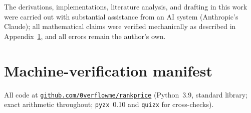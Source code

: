 \documentclass[11pt]{article}
\theoremstyle{definition}
\theoremstyle{remark}
\newcommand{\code}[1]{\texttt{#1}}
\begin{document}
The derivations, implementations, literature analysis, and drafting in this work were carried out
with substantial assistance from an AI system (Anthropic's Claude); all mathematical claims
were verified mechanically as described in Appendix~\ref{app:manifest}, and all errors remain the author's own.

\appendix

\section{Machine-verification manifest}\label{app:manifest}

All code at \href{https://github.com/0verflowme/rankprice}{\code{github.com/0verflowme/rankprice}} (Python~3.9, standard library; exact
arithmetic throughout; \code{pyzx}~0.10 and \code{quizx} for cross-checks).
\end{document}
